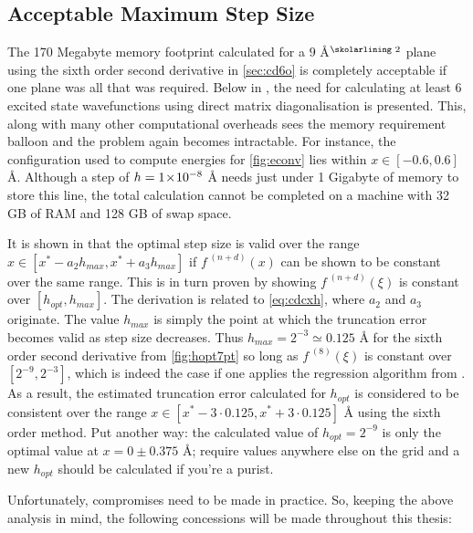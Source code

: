 \subsection{Acceptable Maximum Step Size}

The 170 Megabyte memory footprint calculated for a $9$ Å$^\text{\skolarlining 2}$ plane using the sixth order second derivative in \cref{sec:cd6o} is completely acceptable if one plane was all that was required.
Below in , the need for calculating at least 6 excited state wavefunctions using direct matrix diagonalisation is presented.
This, along with many other computational overheads sees the memory requirement balloon and the problem again becomes intractable.
For instance, the  configuration used to compute energies for \cref{fig:econv} lies within $x \in [-0.6, 0.6]$ Å.
Although a step of $h = 1\!\times\!10^{-8}$ Å needs just under 1 Gigabyte of memory to store this line, the total calculation cannot be completed on a machine with 32 GB of RAM and 128 GB of swap space.

It is shown in \citeauthor{Mathur2012} that the optimal step size is valid over the range $x \in [x^*-a_2h_{max},x^*+a_3h_{max}]$ if $f^{\;(n+d)}(x)$ can be shown to be constant over the same range.
This is in turn proven by showing $f^{\;(n+d)}(\xi)$ is constant over $[h_{opt},h_{max}]$.
The derivation is related to \cref{eq:cdcxh}, where $a_2$ and $a_3$ originate.
The value $h_{max}$ is simply the point at which the truncation error becomes valid as step size decreases.
Thus $h_{max} = 2^{-3} \simeq 0.125$ Å for the sixth order second derivative from \cref{fig:hopt7pt} so long as $f^{\;(8)}(\xi)$ is constant over $[2^{-9},2^{-3}]$, which is indeed the case if one applies the regression algorithm from .
As a result, the estimated truncation error calculated for $h_{opt}$ is considered to be consistent over the range $x \in [x^*-3\cdot0.125,x^*+3\cdot0.125]$ Å using the sixth order method.
Put another way: the calculated value of $h_{opt} = 2^{-9}$ is only the optimal value at $x=0\pm0.375$ Å; require values anywhere else on the grid and a new $h_{opt}$ should be calculated if you're a purist.

Unfortunately, compromises need to be made in practice. So, keeping the above analysis in mind, the following concessions will be made throughout this thesis:

